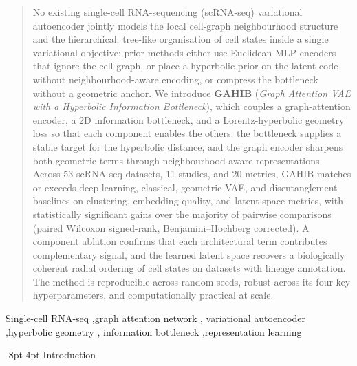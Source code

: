 \documentclass[preprint,12pt]{elsarticle}
\makeatletter
\renewcommand\section{\@startsection{section}{1}{\z@}%
  {-8pt \@plus -2pt \@minus -2pt}%
  {4pt \@plus 1pt \@minus 1pt}%
  {\normalfont\Large\bfseries}}
\makeatother
\begin{document}
\begin{frontmatter}
\begin{abstract}
No existing single-cell RNA-sequencing (scRNA-seq) variational
autoencoder jointly models the local cell-graph neighbourhood
structure and the hierarchical, tree-like organisation of cell
states inside a single variational objective: prior methods either
use Euclidean MLP encoders that ignore the cell graph, or place a
hyperbolic prior on the latent code without neighbourhood-aware
encoding, or compress the bottleneck without a geometric anchor.
We introduce \textbf{GAHIB} (\emph{Graph Attention VAE with a
Hyperbolic Information Bottleneck}), which couples a graph-attention
encoder, a 2D information bottleneck, and a Lorentz-hyperbolic
geometry loss so that each component enables the others: the
bottleneck supplies a stable target for the hyperbolic distance,
and the graph encoder sharpens both geometric terms through
neighbourhood-aware representations.
Across 53 scRNA-seq datasets, 11 studies, and 20 metrics, GAHIB
matches or exceeds deep-learning, classical, geometric-VAE, and
disentanglement baselines on clustering, embedding-quality, and
latent-space metrics, with statistically significant gains over
the majority of pairwise comparisons (paired Wilcoxon signed-rank,
Benjamini--Hochberg corrected). A component ablation confirms
that each architectural term contributes complementary signal,
and the learned latent space recovers a biologically coherent
radial ordering of cell states on datasets with lineage annotation.
The method is reproducible across random seeds, robust across its
four key hyperparameters, and computationally practical at scale.
\end{abstract}

\begin{keyword}
Single-cell RNA-seq \sep graph attention network \sep
variational autoencoder \sep hyperbolic geometry \sep
information bottleneck \sep representation learning
\end{keyword}


\end{frontmatter}

\linenumbers


\section{Introduction}\label{sec:intro}
\end{document}
